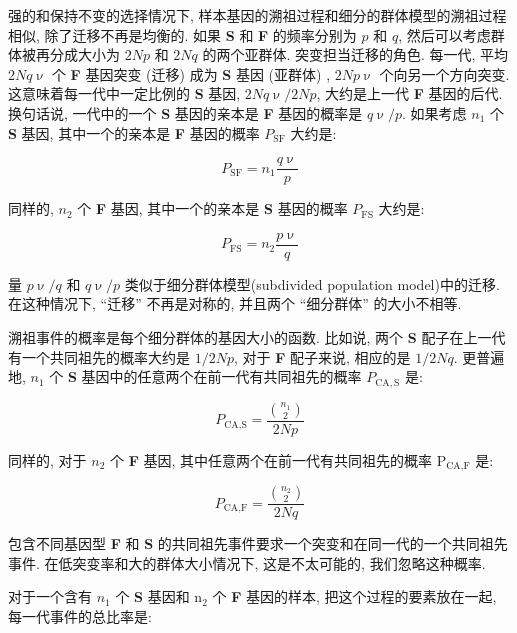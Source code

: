 \documentclass[12pt]{article}
\begin{document}
强的和保持不变的选择情况下, 样本基因的溯祖过程和细分的群体模型的溯祖过程相似, 除了迁移不再是均衡的. 如果 \textbf{S} 和
\textbf{F} 的频率分别为 $p$ 和 $q$, 然后可以考虑群体被再分成大小为 $2Np$ 和 $2Nq$ 的两个亚群体. 突变担当迁移的角色.
每一代, 平均 $2Nq\upnu$ 个 \textbf{F} 基因突变 (迁移) 成为 \textbf{S} 基因 (亚群体) , $2Np\upnu$
个向另一个方向突变. 这意味着每一代中一定比例的 \textbf{S} 基因, $2Nq\upnu/2Np$, 大约是上一代 \textbf{F}
基因的后代. 换句话说, 一代中的一个 \textbf{S} 基因的亲本是 \textbf{F} 基因的概率是 $q\upnu/p$. 如果考虑 $n_{1}$
个 \textbf{S} 基因, 其中一个的亲本是 \textbf{F} 基因的概率 $P_{\text{SF}}$ 大约是:

\begin{equation*}
    P_{\text{SF}}=n_{1}\frac{q\upnu}{p}
\end{equation*}

同样的, $n_{2}$ 个 \textbf{F} 基因, 其中一个的亲本是 \textbf{S} 基因的概率 $P_{\text{FS}}$ 大约是: \newline

\begin{equation*}
    P_{\text{FS}}=n_{2}\frac{p\upnu}{q}
\end{equation*}

量 $p\upnu/q$ 和 $q\upnu/p$ 类似于细分群体模型(subdivided population model)中的迁移. 在这种情况下, ``迁移''
不再是对称的, 并且两个 ``细分群体'' 的大小不相等.

溯祖事件的概率是每个细分群体的基因大小的函数. 比如说, 两个 \textbf{S} 配子在上一代有一个共同祖先的概率大约是 $1/2Np$,
对于 \textbf{F} 配子来说, 相应的是 $1/2Nq$. 更普遍地, $n_{1}$ 个 \textbf{S}
基因中的任意两个在前一代有共同祖先的概率 $P_{\text{CA},\mathrm{S}}$ 是:

\begin{equation*}
    P_{\text{CA},\text{S}}=\frac{\binom{n_1}{2}}{2Np}
\end{equation*}

同样的, 对于 $n_{2}$ 个 \textbf{F} 基因, 其中任意两个在前一代有共同祖先的概率
$\text{P}_{\text{CA},\text{F}}$ 是:

\begin{equation*}
    P_{\text{CA},\text{F}}=\frac{\binom{n_2}{2}}{2Nq}
\end{equation*}

包含不同基因型 \textbf{F} 和 \textbf{S} 的共同祖先事件要求一个突变和在同一代的一个共同祖先事件.
在低突变率和大的群体大小情况下, 这是不太可能的, 我们忽略这种概率.

对于一个含有 $n_{1}$ 个 \textbf{S} 基因和 n$_{\text{2}}$ 个 \textbf{F} 基因的样本, 把这个过程的要素放在一起,
每一代事件的总比率是:
\end{document}
